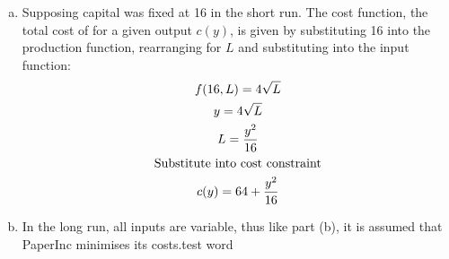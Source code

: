 \documentclass[11pt,a4paper,twocolumn]{article}
\begin{document}
\begin{enumerate}[(a)]
    \begin{figure}[htbp!]
    \hspace*{2em}
    \end{figure}

    \item 

    Supposing capital was fixed at 16 in the short run. The cost function, the total cost of for a given output $c(y)$, is given by substituting 16 into the production function, rearranging for $L$ and substituting into the input function: 
    \begin{gather*}
        f(16,L) = 4\sqrt{L} \\
        y = 4\sqrt{L} \\
        L = \frac{y^2}{16}\\
        \textnormal{Substitute into cost constraint}\\
        c(y) =  64 + \frac{y^2}{16} \\
    \end{gather*}

    \item 

    In the long run, all inputs are variable, thus like part (b), it is assumed that PaperInc minimises its 
    costs.test word
    
\end{enumerate}
\end{document}
